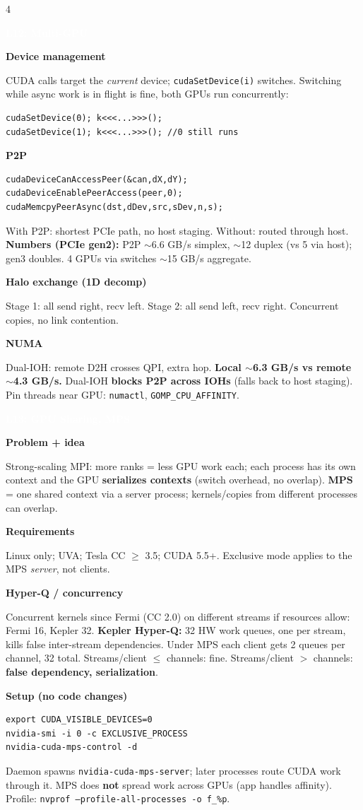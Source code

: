 \documentclass[10pt]{extarticle}
\newcommand{\sect}[1]{\vspace{3pt}\par\colorbox{hdr}{\textcolor{white}{\textbf{\small #1}}}\par\vspace{2pt}}
\newcommand{\sub}[1]{\vspace{2pt}\par\textbf{\footnotesize\textcolor{hdr}{#1}}\par}
\begin{document}
\begin{multicols*}{4}
\sect{L12: Multi-GPU}
\sub{Device management}
CUDA calls target the \emph{current} device; \texttt{cudaSetDevice(i)} switches. Switching while async work is in flight is fine, both GPUs run concurrently:
\begin{lstlisting}
cudaSetDevice(0); k<<<...>>>();
cudaSetDevice(1); k<<<...>>>(); //0 still runs
\end{lstlisting}

\sub{P2P}
\begin{lstlisting}
cudaDeviceCanAccessPeer(&can,dX,dY);
cudaDeviceEnablePeerAccess(peer,0);
cudaMemcpyPeerAsync(dst,dDev,src,sDev,n,s);
\end{lstlisting}
With P2P: shortest PCIe path, no host staging. Without: routed through host.\\
\textbf{Numbers (PCIe gen2):} P2P $\sim$6.6 GB/s simplex, $\sim$12 duplex (vs 5 via host); gen3 doubles. 4 GPUs via switches $\sim$15 GB/s aggregate.

\sub{Halo exchange (1D decomp)}
Stage 1: all send right, recv left. Stage 2: all send left, recv right. Concurrent copies, no link contention.

\sub{NUMA}
Dual-IOH: remote D2H crosses QPI, extra hop. \textbf{Local $\sim$6.3 GB/s vs remote $\sim$4.3 GB/s.} Dual-IOH \textbf{blocks P2P across IOHs} (falls back to host staging). Pin threads near GPU: \texttt{numactl}, \texttt{GOMP\_CPU\_AFFINITY}.

\sect{L13: GPU Sharing, MPS}
\sub{Problem + idea}
Strong-scaling MPI: more ranks = less GPU work each; each process has its own context and the GPU \textbf{serializes contexts} (switch overhead, no overlap). \textbf{MPS} = one shared context via a server process; kernels/copies from different processes can overlap.

\sub{Requirements}
Linux only; UVA; Tesla CC $\geq$ 3.5; CUDA 5.5+. Exclusive mode applies to the MPS \emph{server}, not clients.

\sub{Hyper-Q / concurrency}
Concurrent kernels since Fermi (CC 2.0) on different streams if resources allow: Fermi 16, Kepler 32. \textbf{Kepler Hyper-Q:} 32 HW work queues, one per stream, kills false inter-stream dependencies. Under MPS each client gets 2 queues per channel, 32 total. Streams/client $\leq$ channels: fine. Streams/client $>$ channels: \textbf{false dependency, serialization}.

\sub{Setup (no code changes)}
\begin{lstlisting}
export CUDA_VISIBLE_DEVICES=0
nvidia-smi -i 0 -c EXCLUSIVE_PROCESS
nvidia-cuda-mps-control -d
\end{lstlisting}
Daemon spawns \texttt{nvidia-cuda-mps-server}; later processes route CUDA work through it. MPS does \textbf{not} spread work across GPUs (app handles affinity). Profile: \texttt{nvprof --profile-all-processes -o f\_\%p}.


\end{multicols*}
\end{document}
